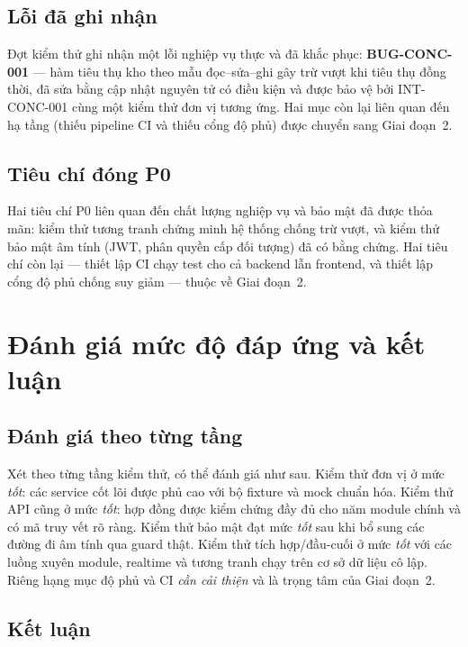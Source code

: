 \documentclass[12pt,a4paper]{article}
\begin{document}
\subsection{Lỗi đã ghi nhận}

Đợt kiểm thử ghi nhận một lỗi nghiệp vụ thực và đã khắc phục: \textbf{BUG-CONC-001} --- hàm tiêu thụ kho theo
mẫu đọc--sửa--ghi gây trừ vượt khi tiêu thụ đồng thời, đã sửa bằng cập nhật nguyên tử có điều kiện và được
bảo vệ bởi INT-CONC-001 cùng một kiểm thử đơn vị tương ứng. Hai mục còn lại liên quan đến hạ tầng (thiếu
pipeline CI và thiếu cổng độ phủ) được chuyển sang Giai đoạn~2.

\subsection{Tiêu chí đóng P0}

Hai tiêu chí P0 liên quan đến chất lượng nghiệp vụ và bảo mật đã được thỏa mãn: kiểm thử tương tranh chứng
minh hệ thống chống trừ vượt, và kiểm thử bảo mật âm tính (JWT, phân quyền cấp đối tượng) đã có bằng chứng.
Hai tiêu chí còn lại --- thiết lập CI chạy test cho cả backend lẫn frontend, và thiết lập cổng độ phủ chống
suy giảm --- thuộc về Giai đoạn~2.

\section{Đánh giá mức độ đáp ứng và kết luận}

\subsection{Đánh giá theo từng tầng}

Xét theo từng tầng kiểm thử, có thể đánh giá như sau. Kiểm thử đơn vị ở mức \emph{tốt}: các service cốt lõi
được phủ cao với bộ fixture và mock chuẩn hóa. Kiểm thử API cũng ở mức \emph{tốt}: hợp đồng được kiểm chứng
đầy đủ cho năm module chính và có mã truy vết rõ ràng. Kiểm thử bảo mật đạt mức \emph{tốt} sau khi bổ sung
các đường đi âm tính qua guard thật. Kiểm thử tích hợp/đầu-cuối ở mức \emph{tốt} với các luồng xuyên module,
realtime và tương tranh chạy trên cơ sở dữ liệu cô lập. Riêng hạng mục độ phủ và CI \emph{cần cải thiện} và
là trọng tâm của Giai đoạn~2.

\subsection{Kết luận}
\end{document}
